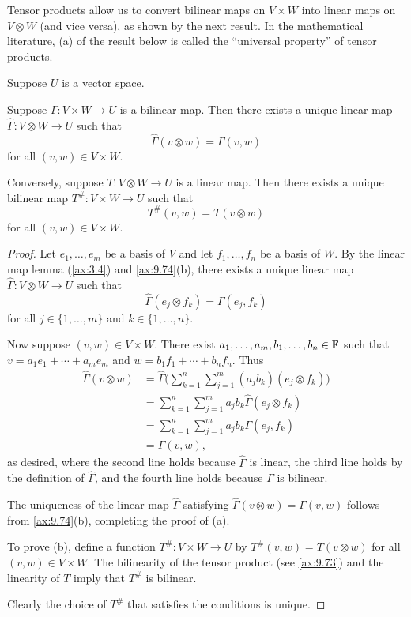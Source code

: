 Tensor products allow us to convert bilinear maps on $V\times W$ into linear
maps on $V\otimes W$ (and vice versa), as shown by the next result. In the
mathematical literature, (a) of the result below is called the ``universal
property'' of tensor products.

\begin{result}\label{ax:9.79}
Suppose $U$ is a vector space.
\begin{parts}
\item Suppose $\Gamma\colon V\times W\to U$ is a bilinear map. Then there
  exists a unique linear map $\hat\Gamma\colon V\otimes W\to U$ such that
  \[ \hat\Gamma(v\otimes w) = \Gamma(v,w) \]
  for all $(v,w)\in V\times W$.
\item Conversely, suppose $T\colon V\otimes W\to U$ is a linear map. Then there
  exists a unique bilinear map $T^\#\colon V\times W\to U$ such that
  \[ T^\#(v,w) = T(v\otimes w) \]
  for all $(v,w)\in V\times W$.
\end{parts}
\end{result}

\begin{proof}
Let $e_1,\dots,e_m$ be a basis of $V$ and let $f_1,\dots,f_n$ be a basis of
$W$. By the linear map lemma (\ref{ax:3.4}) and \ref{ax:9.74}(b), there exists
a unique linear map $\hat\Gamma\colon V\otimes W\to U$ such that
\[ \hat\Gamma(e_j\otimes f_k) = \Gamma(e_j,f_k) \]
for all $j\in\{1,\dots,m\}$ and $k\in\{1,\dots,n\}$.

Now suppose $(v,w)\in V\times W$. There exist
$a_1,\dots,a_m,b_1,\dots,b_n\in\mathbb{F}$ such that $v=a_1e_1+\cdots+a_me_m$ and
$w=b_1f_1+\cdots+b_nf_n$. Thus
\begin{align*}
\hat\Gamma(v\otimes w)
  &= \hat\Gamma\biggl(\sum_{k=1}^n\sum_{j=1}^m (a_jb_k)(e_j\otimes f_k)\biggr)\\
  &= \sum_{k=1}^n\sum_{j=1}^m a_jb_k\hat\Gamma(e_j\otimes f_k)\\
  &= \sum_{k=1}^n\sum_{j=1}^m a_jb_k\Gamma(e_j,f_k)\\
  &= \Gamma(v,w),
\end{align*}
as desired, where the second line holds because $\hat\Gamma$ is linear, the
third line holds by the definition of $\hat\Gamma$, and the fourth line holds
because $\Gamma$ is bilinear.

The uniqueness of the linear map $\hat\Gamma$ satisfying
$\hat\Gamma(v\otimes w)=\Gamma(v,w)$ follows from \ref{ax:9.74}(b), completing
the proof of (a).

To prove (b), define a function $T^\#\colon V\times W\to U$ by
$T^\#(v,w)=T(v\otimes w)$ for all $(v,w)\in V\times W$. The bilinearity of the
tensor product (see \ref{ax:9.73}) and the linearity of $T$ imply that $T^\#$
is bilinear.

Clearly the choice of $T^\#$ that satisfies the conditions is unique.
\end{proof}

